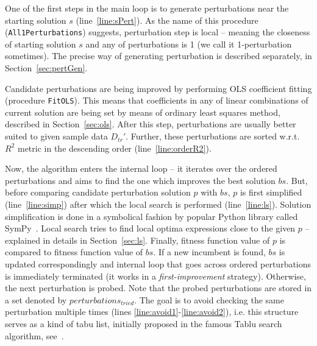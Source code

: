 \documentclass[a4paper,12pt]{elsarticle}
\begin{document}
One of the first steps in the main loop is to generate perturbations near the starting solution $s$ (line~\ref{line:sPert}). 
As the name of this procedure (\texttt{All1Perturbations}) suggests, perturbation step is local -- meaning the closeness of starting solution $s$ and any of perturbations is 1 (we call it 1-perturbation sometimes). The precise way of generating perturbation is described separately, in Section~\ref{sec:pertGen}. 


Candidate perturbations are being improved by performing OLS coefficient fitting (procedure \texttt{FitOLS}). This means that coefficients in any of linear combinations of current solution are being set by means of ordinary least squares method, described in Section~\ref{sec:ols}.   
After this step, perturbations are usually better suited to given sample data $D_{tr}'$. 
Further, these perturbations are sorted w.r.t. $R^2$ metric in the descending order (line~\ref{line:orderR2}). 


Now, the algorithm enters the internal loop -- it iterates over the ordered perturbations and aims to find the one which improves the best solution $bs$. But, before comparing candidate perturbation solution $p$ with $bs$, $p$ is first simplified (line~\ref{line:simp}) after which the local search is performed (line~\ref{line:ls}).
Solution simplification is done in a symbolical fashion by popular Python library called SymPy~\cite{sympy}.
Local search tries to find local optima expressions close to the given $p$ -- explained in details in Section~\ref{sec:ls}.  
Finally, fitness function value of $p$ is compared to fitness function value of $bs$. If a new incumbent is found, $bs$ is updated correspondingly and internal loop that goes across ordered perturbations is immediately terminated (it works in a  \emph{first-improvement} strategy). Otherwise, the next perturbation is probed. 
Note that the probed perturbations are stored in a set denoted by $perturbations_{tried}$. The goal is to avoid checking the same perturbation multiple times (lines \ref{line:avoid1}-\ref{line:avoid2}), i.e. this structure serves as a kind of tabu list, initially proposed in the famous Tablu search algorithm, see~\cite{glover1998tabu}.  
\end{document}
